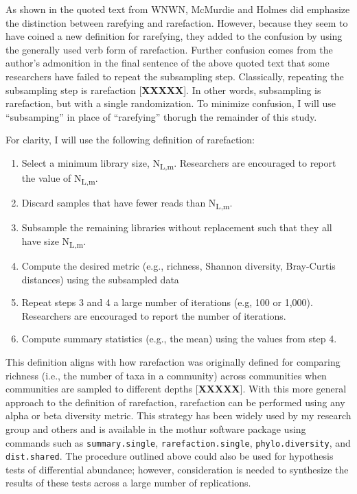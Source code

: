 \documentclass[
]{article}
\providecommand{\tightlist}{%
  \setlength{\itemsep}{0pt}\setlength{\parskip}{0pt}}
\begin{document}
As shown in the quoted text from WNWN, McMurdie and Holmes did emphasize
the distinction between rarefying and rarefaction. However, because they
seem to have coined a new definition for rarefying, they added to the
confusion by using the generally used verb form of rarefaction. Further
confusion comes from the author's admonition in the final sentence of
the above quoted text that some researchers have failed to repeat the
subsampling step. Classically, repeating the subsampling step is
rarefaction {[}\textbf{XXXXX}{]}. In other words, subsampling is
rarefaction, but with a single randomization. To minimize confusion, I
will use ``subsamping'' in place of ``rarefying'' thorugh the remainder
of this study.

For clarity, I will use the following definition of rarefaction:

\begin{enumerate}
\def\labelenumi{\arabic{enumi}.}
\tightlist
\item
  Select a minimum library size, N\textsubscript{L,m}. Researchers are
  encouraged to report the value of N\textsubscript{L,m}.
\item
  Discard samples that have fewer reads than N\textsubscript{L,m}.
\item
  Subsample the remaining libraries without replacement such that they
  all have size N\textsubscript{L,m}.
\item
  Compute the desired metric (e.g., richness, Shannon diversity,
  Bray-Curtis distances) using the subsampled data
\item
  Repeat steps 3 and 4 a large number of iterations (e.g, 100 or 1,000).
  Researchers are encouraged to report the number of iterations.
\item
  Compute summary statistics (e.g., the mean) using the values from step
  4.
\end{enumerate}

This definition aligns with how rarefaction was originally defined for
comparing richness (i.e., the number of taxa in a community) across
communities when communities are sampled to different depths
{[}\textbf{XXXXX}{]}. With this more general approach to the definition
of rarefaction, rarefaction can be performed using any alpha or beta
diversity metric. This strategy has been widely used by my research
group and others and is available in the mothur software package using
commands such as \texttt{summary.single}, \texttt{rarefaction.single},
\texttt{phylo.diversity}, and \texttt{dist.shared}. The procedure
outlined above could also be used for hypothesis tests of differential
abundance; however, consideration is needed to synthesize the results of
these tests across a large number of replications.
\end{document}
